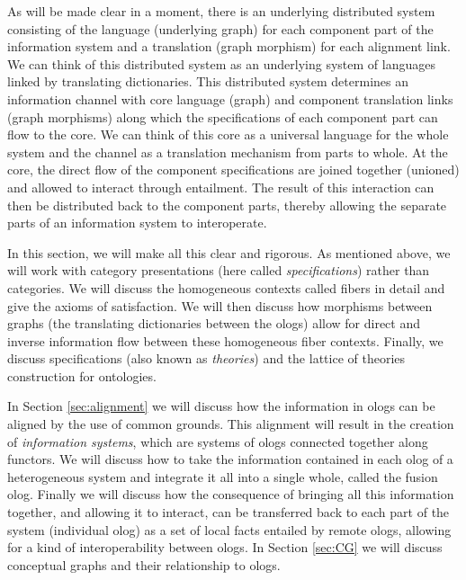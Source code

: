 \documentclass{amsart}
\theoremstyle{remark}
\theoremstyle{definition}
\begin{document}
As will be made clear in a moment, 
there is an underlying distributed system consisting of 
the language (underlying graph) for each component part of the information system and 
a translation (graph morphism) for each alignment link. 
We can think of this distributed system
as an underlying system of languages linked by translating dictionaries.
This distributed system determines an information channel 
with core language (graph) and component translation links (graph morphisms)
along which the specifications of each component part can flow to the core.
We can think of this core as a universal language for the whole system
and the channel as a translation mechanism from parts to whole.
At the core, 
the direct flow of the component specifications are joined together (unioned) and allowed to interact through entailment. 
The result of this interaction can then be distributed back to the component parts,
thereby allowing the separate parts of an information system to interoperate.

In this section, we will make all this clear and rigorous. 
As mentioned above, we will work with category presentations (here called {\em specifications}) rather than categories. 
We will discuss the homogeneous contexts called fibers in detail and give the axioms of satisfaction. 
We will then discuss how morphisms between graphs (the translating dictionaries between the  ologs) allow for direct and inverse information flow between these homogeneous fiber contexts. 
Finally, we discuss specifications (also known as {\em theories}) and the lattice of theories construction for ontologies.

In Section \ref{sec:alignment} 
we will discuss how the information in ologs can be aligned by the use of common grounds. 
This alignment will result in the creation of {\em information systems}, 
which are systems of ologs connected together along functors. 
We will discuss how to take the information contained in each olog of a heterogeneous system and integrate it all into a single whole, called the fusion olog. Finally we will discuss how the consequence of bringing all this information together, and allowing it to interact, can be transferred back to each part of the system (individual olog) as a set of local facts entailed by remote ologs, allowing for a kind of interoperability between ologs.
In Section \ref{sec:CG} we will discuss conceptual graphs and their relationship to ologs.

\end{document}
